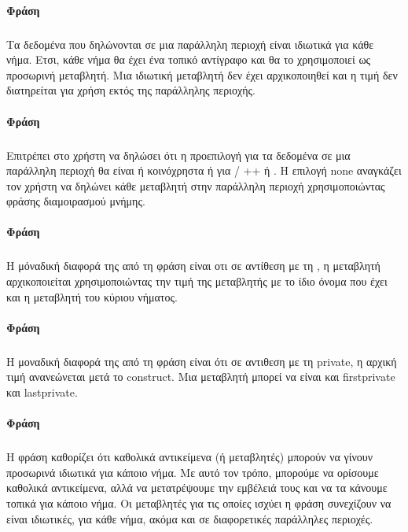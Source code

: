 \paragraph{Φράση }
\subparagraph{}
Τα δεδομένα που δηλώνονται σε μια παράλληλη περιοχή είναι ιδιωτικά για κάθε νήμα. Ετσι, κάθε νήμα θα έχει ένα τοπικό αντίγραφο και θα το χρησιμοποιεί ως προσωρινή μεταβλητή. Μια ιδιωτική μεταβλητή δεν έχει αρχικοποιηθεί και η τιμή δεν διατηρείται για χρήση εκτός της παράλληλης περιοχής.

\paragraph{Φράση }
\subparagraph{}
Επιτρέπει στο χρήστη να δηλώσει ότι η προεπιλογή για τα δεδομένα σε μια παράλληλη περιοχή θα είναι ή κοινόχρηστα ή \emph{} για  / ++ ή {}. Η επιλογή none αναγκάζει τον χρήστη να δηλώνει κάθε μεταβλητή στην παράλληλη περιοχή χρησιμοποιώντας φράσης διαμοιρασμού μνήμης.

\paragraph{Φράση }
\subparagraph{}
Η μόναδική διαφορά της από τη φράση  είναι οτι σε αντίθεση με τη , η μεταβλητή αρχικοποιείται χρησιμοποιώντας την τιμή της μεταβλητής με το ίδιο όνομα που έχει και η μεταβλητή του κύριου νήματος.

\paragraph{Φράση }
\subparagraph{}   

Η μοναδική διαφορά της από τη φράση  είναι ότι σε αντιθεση με τη private, η αρχική τιμή ανανεώνεται μετά το construct. Μια μεταβλητή μπορεί να είναι και firstprivate και lastprivate.


\paragraph{Φράση }
\subparagraph{}
      Η φράση  καθορίζει ότι καθολικά αντικείμενα (ή μεταβλητές) μπορούν να γίνουν προσωρινά ιδιωτικά για κάποιο νήμα. Με αυτό τον τρόπο, μπορούμε να ορίσουμε καθολικά αντικείμενα, αλλά να μετατρέψουμε την εμβέλειά τους και να τα κάνουμε τοπικά για κάποιο νήμα. Οι μεταβλητές για τις οποίες ισχύει η φράση  συνεχίζουν να είναι ιδιωτικές, για κάθε νήμα, ακόμα και σε διαφορετικές παράλληλες περιοχές\cite{pdplab}.

